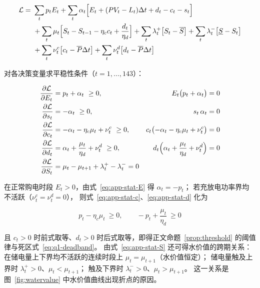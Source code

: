 \begin{equation}
  \begin{aligned}
    \mathcal L=\ &\sum_{t}p_tE_t
    +\sum_{t}\alpha_t\Bigl[E_t+(PV_t-L_t)\Delta t+d_t-c_t-s_t\Bigr]\\
    &+\sum_{t}\mu_t\Bigl[S_t-S_{t-1}-\eta_cc_t+\frac{d_t}{\eta_d}\Bigr]
    +\sum_{t}\lambda^{+}_t\bigl[S_t-\overline S\bigr]
    +\sum_{t}\lambda^{-}_t\bigl[\underline S-S_t\bigr]\\
    &+\sum_{t}\nu^{c}_t\bigl[c_t-\overline P\Delta t\bigr]
    +\sum_{t}\nu^{d}_t\bigl[d_t-\overline P\Delta t\bigr]
  \end{aligned}
  \label{eq:app-lag}
\end{equation}

对各决策变量求平稳性条件（\(t=1,\dots,143\)）：

\begin{align}
  \frac{\partial\mathcal L}{\partial E_t}&=p_t+\alpha_t\ \ge 0,
  &E_t\bigl(p_t+\alpha_t\bigr)&=0 \label{eq:app-stat-E}\\
  \frac{\partial\mathcal L}{\partial s_t}&=-\alpha_t\ \ge 0,
  &s_t\,\alpha_t&=0 \label{eq:app-stat-s}\\
  \frac{\partial\mathcal L}{\partial c_t}&=-\alpha_t-\eta_c\mu_t+\nu^{c}_t\ \ge 0,
  &c_t\bigl(-\alpha_t-\eta_c\mu_t+\nu^{c}_t\bigr)&=0 \label{eq:app-stat-c}\\
  \frac{\partial\mathcal L}{\partial d_t}&=\alpha_t+\frac{\mu_t}{\eta_d}+\nu^{d}_t\ \ge 0,
  &d_t\Bigl(\alpha_t+\frac{\mu_t}{\eta_d}+\nu^{d}_t\Bigr)&=0 \label{eq:app-stat-d}\\
  \frac{\partial\mathcal L}{\partial S_t}&=\mu_t-\mu_{t+1}+\lambda^{+}_t-\lambda^{-}_t=0
  \label{eq:app-stat-S}
\end{align}

在正常购电时段 \(E_t>0\)，由式~\eqref{eq:app-stat-E} 得 \(\alpha_t=-p_t\)；
若充放电功率界均不活跃（\(\nu^{c}_t=\nu^{d}_t=0\)），
则式~\eqref{eq:app-stat-c}、\eqref{eq:app-stat-d} 化为

\begin{equation}
  p_t-\eta_c\mu_t\ \ge 0,\qquad
  -p_t+\frac{\mu_t}{\eta_d}\ \ge 0
  \label{eq:app-threshold-raw}
\end{equation}

且 \(c_t>0\) 时前式取等、\(d_t>0\) 时后式取等，即得正文命题~\ref{prop:threshold}
的阈值律与死区式~\eqref{eq:q1-deadband}。
由式~\eqref{eq:app-stat-S} 还可得水价值的跨期关系：
在储电量上下界均不活跃的连续时段上 \(\mu_t=\mu_{t+1}\)（水价值恒定）；
储电量触及上界时 \(\lambda^{+}_t>0\)、\(\mu_t<\mu_{t+1}\)；
触及下界时 \(\lambda^{-}_t>0\)、\(\mu_t>\mu_{t+1}\)。
这一关系是图~\ref{fig:watervalue} 中水价值曲线出现折点的原因。

